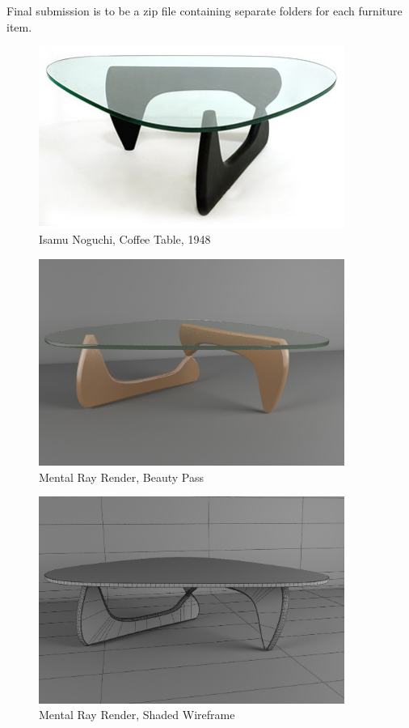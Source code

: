 Final submission is to be a zip file containing separate folders for each furniture item.\\

\vspace{1cm}

\begin{figure}[hb]
	\centering
		\includegraphics[width=10cm]{img/noguchi-1948.jpg}
		\caption{Isamu Noguchi, Coffee Table, 1948}
	\label{fig:noguchi-1948}
\end{figure}


\begin{figure}[hb]
	\centering
		\includegraphics[width=10cm]{img/CoffeTableBeauty.jpg}
		\caption{Mental Ray Render, Beauty Pass}
	\label{fig:noguchi-1948}
\end{figure}

\begin{figure}[hb]
	\centering
		\includegraphics[width=10cm]{img/CoffeTableWireShade.jpg}
		\caption{Mental Ray Render, Shaded Wireframe}
	\label{fig:noguchi-1948}
\end{figure}

